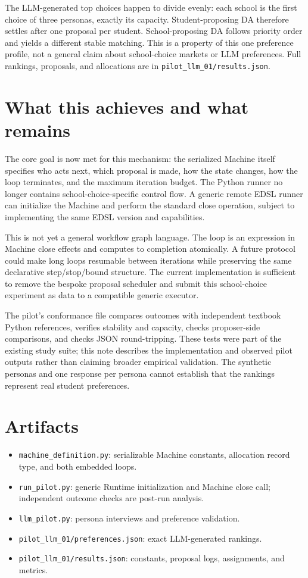 \documentclass[11pt]{article}
\begin{document}
The LLM-generated top choices happen to divide evenly: each school is the first choice of three personas, exactly its capacity. Student-proposing DA therefore settles after one proposal per student. School-proposing DA follows priority order and yields a different stable matching. This is a property of this one preference profile, not a general claim about school-choice markets or LLM preferences. Full rankings, proposals, and allocations are in \texttt{pilot\_llm\_01/results.json}.

\section{What this achieves and what remains}
The core goal is now met for this mechanism: the serialized Machine itself specifies who acts next, which proposal is made, how the state changes, how the loop terminates, and the maximum iteration budget. The Python runner no longer contains school-choice-specific control flow. A generic remote EDSL runner can initialize the Machine and perform the standard close operation, subject to implementing the same EDSL version and capabilities.

This is not yet a general workflow graph language. The loop is an expression in Machine close effects and computes to completion atomically. A future protocol could make long loops resumable between iterations while preserving the same declarative step/stop/bound structure. The current implementation is sufficient to remove the bespoke proposal scheduler and submit this school-choice experiment as data to a compatible generic executor.

The pilot's conformance file compares outcomes with independent textbook Python references, verifies stability and capacity, checks proposer-side comparisons, and checks JSON round-tripping. These tests were part of the existing study suite; this note describes the implementation and observed pilot outputs rather than claiming broader empirical validation. The synthetic personas and one response per persona cannot establish that the rankings represent real student preferences.

\appendix
\section{Artifacts}
\begin{itemize}[leftmargin=*]
\item \texttt{machine\_definition.py}: serializable Machine constants, allocation record type, and both embedded loops.
\item \texttt{run\_pilot.py}: generic Runtime initialization and Machine close call; independent outcome checks are post-run analysis.
\item \texttt{llm\_pilot.py}: persona interviews and preference validation.
\item \texttt{pilot\_llm\_01/preferences.json}: exact LLM-generated rankings.
\item \texttt{pilot\_llm\_01/results.json}: constants, proposal logs, assignments, and metrics.
\end{itemize}
\end{document}

